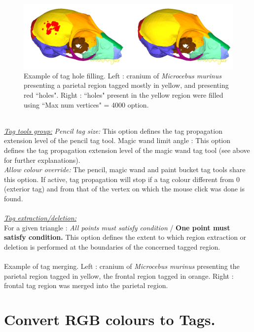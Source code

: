 \begin{figure}
  \centering
  \includegraphics[scale=0.25]{images/Tags/Fill_holes2.png} 
	\caption{Example of tag hole filling. Left : cranium of \textit{Microcebus murinus} presenting a parietal region tagged mostly in yellow, and presenting red ``holes". Right : ``holes" present in the yellow region were filled using ``Max num vertices" = 4000 option.
}
\label{tag_fill_holes_example}
 \end{figure}
\\
\noindent
\textit{\underline{Tag tools group:}}
\textit{Pencil tag size:} This option defines the tag propagation extension
level of the pencil tag tool. Magic wand limit angle : This option defines the tag propagation extension level of the magic wand tag tool (see above for further explanations).\\
\textit{Allow colour override:} The pencil, magic wand and paint bucket tag tools share this option. If active, tag propagation will stop if a tag colour different from 0 (exterior tag) and from that of the vertex on which the mouse click was done is found.\\
\\
\noindent
\textit{\underline{Tag extraction/deletion:}}\\
For a given triangle : \textit{All points must satisfy condition} / \textbf{One point must satisfy condition.} This option defines the extent to which region extraction or deletion is performed at the boundaries of the concerned tagged region.\\\\
\noindent
Example of tag merging. Left : cranium of \textit{Microcebus murinus} presenting the parietal region
tagged in yellow, the frontal region tagged in orange. Right : frontal tag region was merged into the parietal region.


\section{Convert RGB colours to Tags.}

